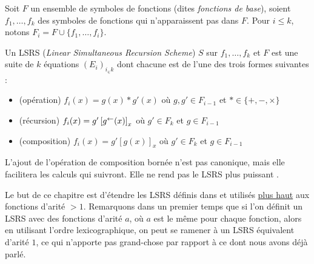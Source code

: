 		
		\begin{definition}[LSRS]
			\label{def:LSRS_2}
			Soit $F$ un ensemble de symboles de fonctions (dites \emph{fonctions de base}), soient $f_1, \dots, f_k$ des symboles de fonctions qui n'apparaissent pas dans $F$. Pour $i\leqslant k$, notons $F_i = F\cup \{f_1, \dots, f_i\}$. 
		
			Un LSRS (\emph{Linear Simultaneous Recursion Scheme}) $S$ sur $f_1, \dots, f_k$ et $F$ est une suite de $k$ équations $\left(E_i\right)_{i_\in k}$ dont chacune est de l'une des trois formes suivantes :
			
			\begin{itemize}[itemsep=-1mm]
				\item 	(opération) 		$f_i(x) = g(x) * g'(x)$ où $g,g' \in F_{i-1}$ et $* \in \{+, -, \times \}$ %
				
				
				\item 	(récursion)			$f_i(x) = g'\left[ g^{\leftarrow}(x) \right]_{x}$ où $g' \in F_k$ et $g \in F_{i-1}$			
				
				\item 	(composition)			$f_i(x) = g'\left[g(x)\right]_x$ où $g' \in F_k$ et $g \in F_{i-1}$
			\end{itemize}
		\end{definition}
		
		\begin{remark}
			L'ajout de l'opération de composition bornée n'est pas canonique, mais elle facilitera les calculs qui suivront. Elle ne rend pas le LSRS plus puissant \cite{GrandjeanSchwentick2002}.
		\end{remark}
		
		\label{rmq:choix_arites}
		Le but de ce chapitre est d'étendre les LSRS définis dans \cite{GrandjeanSchwentick2002} et utilisés \hyperref[def:LSRS]{plus haut} aux fonctions d'arité $>1$. Remarquons dans un premier temps que si l'on définit un LSRS avec des fonctions d'arité $a$, où $a$ est le même pour chaque fonction, alors en utilisant l'ordre lexicographique, on peut se ramener à un LSRS équivalent d'arité $1$, ce qui n'apporte pas grand-chose par rapport à ce dont nous avons déjà parlé.
		

